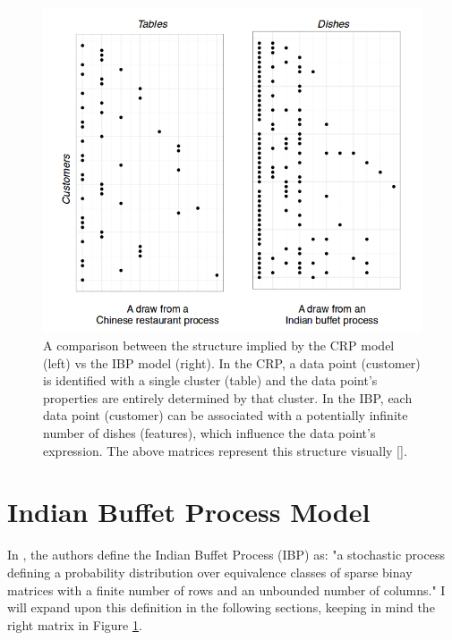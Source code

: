 \documentclass[twoside]{article}
\begin{document}
\begin{figure}[h]
  \centering
    \includegraphics[scale=0.40]{crp_vs_ibp}
    \caption{A comparison between the structure implied by the CRP model (left) vs the IBP model (right). In the CRP, a data point (customer) is identified with a single cluster (table) and the data point's properties are entirely determined by that cluster. In the IBP, each data point (customer) can be associated with a potentially infinite number of dishes (features), which influence the data point's expression. The above matrices represent this structure visually [\citet{Gershman2011}].}
  \label{fig:ibp_crp}
\end{figure}

\section{Indian Buffet Process Model}
In \citet{Griffiths2011}, the authors define the Indian Buffet Process (IBP) as: "a stochastic process defining a probability distribution over equivalence classes of sparse binay matrices with a finite number of rows and an unbounded number of columns." I will expand upon this definition in the following sections, keeping in mind the right matrix in Figure \ref{fig:ibp_crp}.
\end{document}

